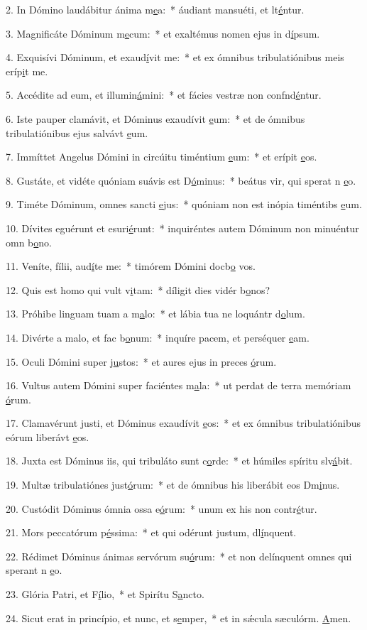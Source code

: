 2. In Dómino laudábitur ánima m\uline{e}a:~* áudiant mansuéti, et lt\uline{é}ntur.\par 
3. Magnificáte Dóminum m\uline{e}cum:~* et exaltémus nomen ejus in d\uline{í}psum.\par 
4. Exquisívi Dóminum, et exaud\uline{í}vit me:~* et ex ómnibus tribulatiónibus meis eríp\uline{i}t me.\par 
5. Accédite ad eum, et illumin\uline{á}mini:~* et fácies vestræ non confnd\uline{é}ntur.\par 
6. Iste pauper clamávit, et Dóminus exaudívit \uline{e}um:~* et de ómnibus tribulatiónibus ejus salvávt \uline{e}um.\par 
7. Immíttet Angelus Dómini in circúitu timéntium \uline{e}um:~* et erípit \uline{e}os.\par 
8. Gustáte, et vidéte quóniam suávis est D\uline{ó}minus:~* beátus vir, qui sperat n \uline{e}o.\par 
9. Timéte Dóminum, omnes sancti \uline{e}jus:~* quóniam non est inópia timéntibs \uline{e}um.\par 
10. Dívites eguérunt et esuri\uline{é}runt:~* inquiréntes autem Dóminum non minuéntur omn b\uline{o}no.\par 
11. Veníte, fílii, aud\uline{í}te me:~* timórem Dómini docb\uline{o} vos.\par 
12. Quis est homo qui vult v\uline{i}tam:~* díligit dies vidér b\uline{o}nos?\par 
13. Próhibe linguam tuam a m\uline{a}lo:~* et lábia tua ne loquántr d\uline{o}lum.\par 
14. Divérte a malo, et fac b\uline{o}num:~* inquíre pacem, et perséquer \uline{e}am.\par 
15. Oculi Dómini super j\uline{u}stos:~* et aures ejus in preces \uline{ó}rum.\par 
16. Vultus autem Dómini super faciéntes m\uline{a}la:~* ut perdat de terra memóriam \uline{ó}rum.\par 
17. Clamavérunt justi, et Dóminus exaudívit \uline{e}os:~* et ex ómnibus tribulatiónibus eórum liberávt \uline{e}os.\par 
18. Juxta est Dóminus iis, qui tribuláto sunt c\uline{o}rde:~* et húmiles spíritu slv\uline{á}bit.\par 
19. Multæ tribulatiónes just\uline{ó}rum:~* et de ómnibus his liberábit eos Dm\uline{i}nus.\par 
20. Custódit Dóminus ómnia ossa e\uline{ó}rum:~* unum ex his non contr\uline{é}tur.\par 
21. Mors peccatórum p\uline{é}ssima:~* et qui odérunt justum, dl\uline{í}nquent.\par 
22. Rédimet Dóminus ánimas servórum su\uline{ó}rum:~* et non delínquent omnes qui sperant n \uline{e}o.\par 
23. Glória Patri, et F\uline{í}lio,~* et Spirítu S\uline{a}ncto.\par 
24. Sicut erat in princípio, et nunc, et s\uline{e}mper,~* et in sǽcula sæculórm. \uline{A}men.\par 
